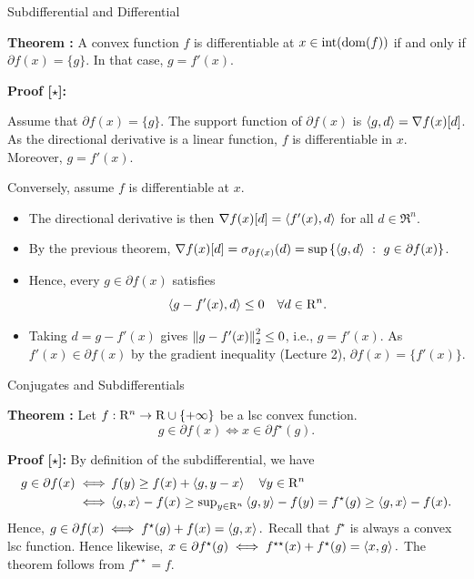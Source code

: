 \documentclass[9pt]{beamer}
\begin{document}
\begin{frame}{Subdifferential and Differential}

  \textbf{Theorem :} A convex function $f$ is differentiable at $x\in\operatorname{int}(\operatorname{dom}(f))$ if and only if $\partial f(x) = \{g\}$. In that case, $g = f'(x)$.

  \vfill
  
  \textbf{Proof [$\star$]:}

  Assume that $\partial f(x)=\{g\}$. The support function of $\partial f(x)$ is $\left<g, d\right> = \nabla f(x)[d]$. As the directional derivative is a linear function, $f$ is differentiable in $x$. Moreover, $g = f'(x)$.

  Conversely, assume $f$ is differentiable at $x$.
  \begin{itemize}
  \item The directional derivative is then $\nabla f(x)[d]=\left<f'(x), d\right>$ for all $d\in\Re^n$.
  \item By the previous theorem, $\nabla f(x)[d]= \sigma_{\partial f(x)}(d)=\sup\left\{ \left<g, d\right>\ : \ g\in\partial f(x) \right\}$.
  \item Hence, every $g\in\partial f(x)$ satisfies
    \[
      \left<g-f'(x), d\right>\leq 0\quad\forall d\in\mathrm{R}^n.
    \]
  \item Taking $d=g-f'(x)$ gives $\left\|g-f'(x)\right\|_2^2\leq 0$, i.e., $g=f'(x)$. As $f'(x)\in\partial f(x)$ by the gradient inequality (Lecture 2), $\partial f(x)=\{f'(x)\}$.
  \end{itemize}
\end{frame}

\begin{frame}{Conjugates and Subdifferentials}

  

  \textbf{Theorem : } Let $f:\mathrm{R}^n\to\mathrm{R}\cup\{+\infty\}$ be a \ac{lsc} convex function. $$g \in \partial f(x) \iff x \in \partial f^\star(g).$$

  \vfill
  
  \textbf{Proof [$\star$]:}
  By definition of the subdifferential, we have
  \begin{align*}
    g\in \partial f(x) \iff & \,f(y) \geq f(x) + \left<g, y-x\right> \quad \forall y\in\mathrm{R}^n\\
                       \iff & \left<g, x\right>-f(x) \geq {\textstyle\sup_{y\in \mathrm{R}^n}} \left<g, y\right> -f(y) = f^\star(g) \geq \left<g, x\right>-f(x).
  \end{align*}
  Hence,
  \(
  g\in \partial f(x) \iff f^\star(g) + f(x) = \left<g, x\right>.
  \)
  Recall that $f^\star$ is always a convex \ac{lsc} function. Hence likewise,
  \(
  x \in \partial f^\star(g) \iff f^{\star\star}(x) + f^\star(g) = \left<x, g\right>.
  \)
  The theorem follows from $f^{\star\star}=f$.
\end{frame}
\end{document}
